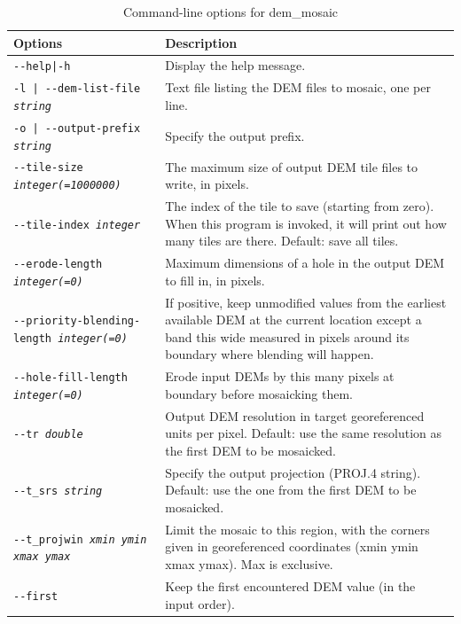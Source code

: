 \begin{longtable}{|l|p{10cm}|}
\caption{Command-line options for dem\_mosaic}
\label{tbl:demmosaic}
\endfirsthead
\endhead
\endfoot
\endlastfoot
\hline
Options & Description \\
\hline \hline

\texttt{-\/-help|-h} & Display the help message.\\ \hline
\texttt{-l | -\/-dem-list-file \textit{string}}  &
Text file listing the DEM files to mosaic, one per line.
\\ \hline
\texttt{-o | -\/-output-prefix  \textit{string} } &
Specify the output prefix.
\\ \hline
\texttt{-\/-tile-size \textit{integer(=1000000)}} &
The maximum size of output DEM tile files to write, in pixels.
\\ \hline
\texttt{-\/-tile-index \textit{integer}} &
The index of the tile to save (starting from zero). When this program is invoked, it will print  out how many tiles are there. Default: save all tiles.
\\ \hline

\texttt{-\/-erode-length \textit{integer(=0)} }  &
Maximum dimensions of a hole in the output DEM to fill in, in pixels.
\\ \hline

\texttt{-\/-priority-blending-length \textit{integer(=0)} }  &
If positive, keep unmodified values from the earliest available DEM at the current location except a band this wide measured in pixels around its boundary where blending will happen.
\\ \hline

\texttt{-\/-hole-fill-length \textit{integer(=0)} }  &
Erode input DEMs by this many pixels at boundary before mosaicking them.
\\ \hline

\texttt{-\/-tr \textit{double}  } &
Output DEM resolution in target georeferenced units per pixel. Default: use the same resolution as the first DEM to be mosaicked.
\\ \hline
\texttt{-\/-t\_srs \textit{string} } &
Specify the output projection (PROJ.4 string). Default: use the one from the first DEM to be mosaicked.
\\ \hline
\texttt{-\/-t\_projwin \textit{xmin ymin xmax ymax} } &
Limit the mosaic to this region, with the corners given in georeferenced coordinates (xmin ymin xmax ymax). Max is exclusive.
\\ \hline

\texttt{-\/-first}
& Keep the first encountered DEM value (in the input order).
\\ \hline


\end{longtable}
